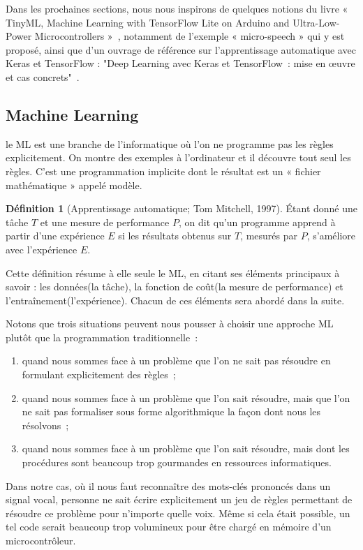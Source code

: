 \documentclass[a4paper,12pt,twoside]{report}
\theoremstyle{definition}
\newtheorem{defi}{Définition}
\theoremstyle{plain}
\theoremstyle{remark}
\begin{document}
Dans les prochaines sections, nous nous inspirons de quelques notions du livre « TinyML, Machine Learning with TensorFlow Lite on Arduino and Ultra-Low-Power Microcontrollers »~\cite{warden2019tinyml}, notamment de l'exemple « micro-speech » qui y est proposé, ainsi que d'un ouvrage de référence sur l'apprentissage automatique avec Keras et TensorFlow : "Deep Learning avec Keras et TensorFlow~: mise en \oe uvre et cas concrets"~\cite{geron2023deeplearning}.

\subsection{Machine Learning}

le \ac{ML} est une branche de l'informatique où l'on ne programme pas les règles explicitement. On montre des exemples à l'ordinateur et il découvre tout seul les règles. C'est une programmation implicite dont le résultat est un « fichier mathématique » appelé modèle.

\begin{defi}[Apprentissage automatique; Tom Mitchell, 1997]
	Étant donné une tâche $T$ et une mesure de performance $P$, on dit qu'un programme apprend à partir d'une expérience $E$ si les résultats obtenus sur $T$, mesurés par $P$, s'améliore avec l'expérience $E$.
\end{defi}

Cette définition résume à elle seule le \ac{ML}, en citant ses éléments principaux à savoir : les données(la tâche), la fonction de coût(la mesure de performance) et l'entraînement(l'expérience). Chacun de ces éléments sera abordé dans la suite.

Notons que trois situations peuvent nous pousser à choisir une approche \ac{ML} plutôt que la programmation traditionnelle~:
\begin{enumerate}
	\item quand nous sommes face à un problème que l'on ne sait pas résoudre en formulant explicitement des règles~;
	\item quand nous sommes face à un problème que l'on sait résoudre, mais que l'on ne sait pas formaliser sous forme algorithmique la façon dont nous les résolvons~;
	\item quand nous sommes face à un problème que l'on sait résoudre, mais dont les procédures sont beaucoup trop gourmandes en ressources informatiques.
\end{enumerate}

Dans notre cas, où il nous faut reconnaître des mots-clés prononcés dans un signal vocal, personne ne sait écrire explicitement un jeu de règles permettant de résoudre ce problème pour n'importe quelle voix. Même si cela était possible, un tel code serait beaucoup trop volumineux pour être chargé en mémoire d'un microcontrôleur.
\end{document}
